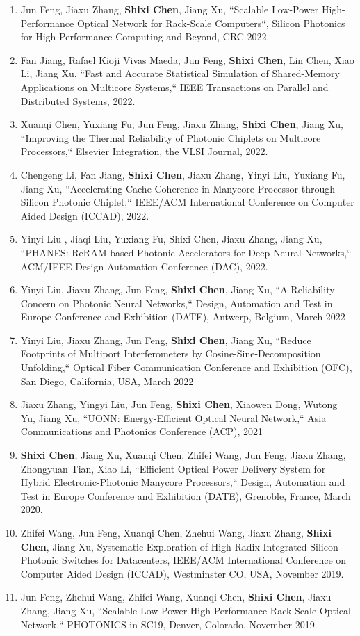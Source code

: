 \documentclass{mycv}
\begin{document}
\begin{enumerate}
	\item Jun Feng, Jiaxu Zhang, \textbf{Shixi Chen}, Jiang Xu, ``Scalable Low-Power High-Performance Optical Network for Rack-Scale Computers``, Silicon Photonics for High-Performance Computing and Beyond, CRC 2022.
	\item Fan Jiang, Rafael Kioji Vivas Maeda, Jun Feng, \textbf{Shixi Chen}, Lin Chen, Xiao Li, Jiang Xu, ``Fast and Accurate Statistical Simulation of Shared-Memory Applications on Multicore Systems,`` IEEE Transactions on Parallel and Distributed Systems, 2022.
	\item Xuanqi Chen, Yuxiang Fu, Jun Feng, Jiaxu Zhang, \textbf{Shixi Chen}, Jiang Xu, ``Improving the Thermal Reliability of Photonic Chiplets on Multicore Processors,`` Elsevier Integration, the VLSI Journal, 2022.
	\item Chengeng Li, Fan Jiang, \textbf{Shixi Chen}, Jiaxu Zhang, Yinyi Liu, Yuxiang Fu, Jiang Xu, ``Accelerating Cache Coherence in Manycore Processor through Silicon Photonic Chiplet,`` IEEE/ACM International Conference on Computer Aided Design (ICCAD), 2022.
	\item Yinyi Liu \textsuperscript{\textdagger}, Jiaqi Liu\textsuperscript{\textdagger}, Yuxiang Fu, Shixi Chen, Jiaxu Zhang, Jiang Xu, ``PHANES: ReRAM-based Photonic Accelerators for Deep Neural Networks,`` ACM/IEEE Design Automation Conference (DAC), 2022.
	\item Yinyi Liu, Jiaxu Zhang, Jun Feng, \textbf{Shixi Chen}, Jiang Xu, ``A Reliability Concern on Photonic Neural Networks,`` Design, Automation and Test in Europe Conference and Exhibition (DATE), Antwerp, Belgium, March 2022
	\item Yinyi Liu, Jiaxu Zhang, Jun Feng, \textbf{Shixi Chen}, Jiang Xu, ``Reduce Footprints of Multiport Interferometers by Cosine-Sine-Decomposition Unfolding,`` Optical Fiber Communication Conference and Exhibition (OFC), San Diego, California, USA, March 2022
	\item Jiaxu Zhang, Yingyi Liu, Jun Feng, \textbf{Shixi Chen}, Xiaowen Dong, Wutong Yu, Jiang Xu, ``UONN: Energy-Efficient Optical Neural Network,`` Asia Communications and Photonics Conference (ACP), 2021
	\item \textbf{Shixi Chen}, Jiang Xu, Xuanqi Chen, Zhifei Wang, Jun Feng, Jiaxu Zhang, Zhongyuan Tian, Xiao Li, ``Efficient Optical Power Delivery System for Hybrid Electronic-Photonic Manycore Processors,`` Design, Automation and Test in Europe Conference and Exhibition (DATE), Grenoble, France, March 2020.
	\item Zhifei Wang, Jun Feng, Xuanqi Chen, Zhehui Wang, Jiaxu Zhang, \textbf{Shixi Chen}, Jiang Xu, Systematic Exploration of High-Radix Integrated Silicon Photonic Switches for Datacenters, IEEE/ACM International Conference on Computer Aided Design (ICCAD), Westminster CO, USA, November 2019.
	\item Jun Feng, Zhehui Wang, Zhifei Wang, Xuanqi Chen, \textbf{Shixi Chen}, Jiaxu Zhang, Jiang Xu, ``Scalable Low-Power High-Performance Rack-Scale Optical Network,`` PHOTONICS in SC19, Denver, Colorado, November 2019.
\end{enumerate}
\end{document}
